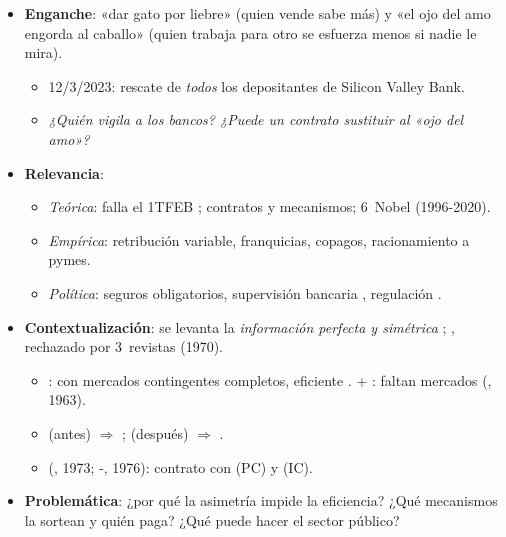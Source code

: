 \documentclass{article}
\begin{document}
\cabecerarepaso
\begin{columnas}

\begin{itemize}
\item \textbf{Enganche}: «dar gato por liebre» (quien vende sabe más) y «el ojo del amo engorda al caballo» (quien trabaja para otro se esfuerza menos si nadie le mira).
  \begin{itemize}
  \item 12/3/2023: rescate de \emph{todos} los depositantes de Silicon Valley Bank.
  \item \emph{¿Quién vigila a los bancos? ¿Puede un contrato sustituir al «ojo del amo»?}
  \end{itemize}
\item \textbf{Relevancia}:
  \begin{itemize}
  \item \emph{Teórica}: falla el 1TFEB ; contratos y mecanismos; 6~Nobel (1996-2020).
  \item \emph{Empírica}: retribución variable, franquicias, copagos, racionamiento a pymes.
  \item \emph{Política}: seguros obligatorios, supervisión bancaria , regulación .
  \end{itemize}
\item \textbf{Contextualización}: se levanta la \emph{información perfecta y simétrica} ; , rechazado por 3~revistas (1970).
  \begin{itemize}
  \item {}: con mercados contingentes completos, eficiente .  + : faltan mercados (, 1963).
  \item {} (antes) $\Rightarrow$ ;  (después) $\Rightarrow$ .
  \item {} (, 1973; -, 1976): contrato con  (PC) y  (IC).
  \end{itemize}
\item \textbf{Problemática}: ¿por qué la asimetría impide la eficiencia? ¿Qué mecanismos la sortean y quién paga? ¿Qué puede hacer el sector público?

\end{itemize}
\end{columnas}
\end{document}
